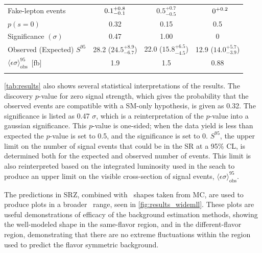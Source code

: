 \begin{table}
\begin{center}
\begin{tabular*}{\textwidth}{@{\extracolsep{\fill}}lccc}
 Fake-lepton events                                                         & $\makebox[3ex]{\hfill 0.1}_{-0.1}^{+0.8}$   & $0.5_{-0.5}^{+0.7}$ &   $\makebox[3ex]{\hfill 0}^{+0.2}$    \\
 \noalign{\smallskip}\hline\noalign{\smallskip}
$p(s=0)$                                                                    & 0.32      & 0.15        & 0.5        \\
Significance $(\sigma)$                                                               & 0.47                     & 1.00                   & 0           \\
Observed (Expected) $S^{95}$                                                & 28.2 ($24.5_{-6.7}^{+8.9}$) & 22.0 ($15.8_{-4.5}^{+6.5}$) & 12.9 ($14.0_{-3.9}^{+5.7}$) \\
$\langle\epsilon\sigma\rangle^{95}_\text{obs}$~[fb]                         & 1.9             & 1.5                    & 0.88   \\
 \noalign{\smallskip}\hline\noalign{\smallskip}
\end{tabular*}
\end{center}
\label{tab:results}
\end{table}

\autoref{tab:results} also shows several statistical interpretations of the results. The discovery $p$-value for zero signal strength, which gives the probability that the observed events are compatible with a \ac{SM}-only hypothesis, is given as 0.32. The significance is listed as 0.47 $\sigma$, which is a reinterpretation of the $p$-value into a gaussian significance. This $p$-value is one-sided; when the data yield is less than expected the $p$-value is set to 0.5, and the significance is set to 0. $S^{95}$, the upper limit on the number of signal events that could be in the \ac{SR} at a 95\% \ac{CL}, is determined both for the expected and observed number of events. This limit is also reinterpreted based on the integrated luminosity used in the seach to produce an upper limit on the visible cross-section of signal events, $\langle\epsilon\sigma\rangle^{95}_\text{obs}$.

The predictions in SRZ, combined with \mll~shapes taken from \ac{MC}, are used to produce plots in a broader \mll~range, seen in \autoref{fig:results_widemll}. These plots are useful demonstrations of efficacy of the background estimation methods, showing the well-modeled \dyjets shape in the same-flavor region, and in the different-flavor region, demonstrating that there are no extreme fluctuations within the region used to predict the flavor symmetric background.

